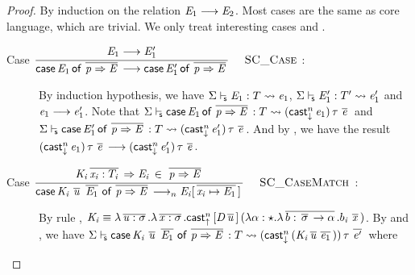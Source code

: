 \begin{proof}
    By induction on the relation $\mathit{E_{{\mathrm{1}}}}  \longrightarrow  \mathit{E_{{\mathrm{2}}}}$. Most cases are the same as
core language, which are trivial. We only treat interesting cases
 and .
    \begin{description}
        \item[Case \scriptsize{${\displaystyle\frac{\begin{array}{l} {\mathit{E_{{\mathrm{1}}}} \longrightarrow \mathit{E'_{{\mathrm{1}}}}} \end{array}}{ \mathsf{case} \, \mathit{E_{{\mathrm{1}}}} \, \mathsf{of} \, \,\overline{ \mathit{p} \Rightarrow \mathit{E} }\, \longrightarrow \mathsf{case} \, \mathit{E'_{{\mathrm{1}}}} \, \mathsf{of} \, \,\overline{ \mathit{p} \Rightarrow \mathit{E} }\,}\quad\textsc{ {\textsc{SC\_Case}}{} }}$}:] $\quad$ \\
        By induction hypothesis, we have $ \Sigma  \vdash_{\!\!\mathsf{s} }  \mathit{E_{{\mathrm{1}}}}  :  T   \rightsquigarrow   \mathit{e_{{\mathrm{1}}}} $, $ \Sigma  \vdash_{\!\!\mathsf{s} }  \mathit{E'_{{\mathrm{1}}}}  :  T'   \rightsquigarrow   \mathit{e'_{{\mathrm{1}}}} $ and $\mathit{e_{{\mathrm{1}}}}  \longrightarrow  \mathit{e'_{{\mathrm{1}}}}$. Note that $ \Sigma  \vdash_{\!\!\mathsf{s} }  \mathsf{case} \, \mathit{E_{{\mathrm{1}}}} \, \mathsf{of} \, \,\overline{  \mathit{p}  \Rightarrow  \mathit{E}  }\,  :  T   \rightsquigarrow   (  \mathsf{cast}_{\downarrow}^n \, \mathit{e_{{\mathrm{1}}}}  ) \, \tau \, \,\overline{  \mathit{e}  }\, $ and $ \Sigma  \vdash_{\!\!\mathsf{s} }  \mathsf{case} \, \mathit{E'_{{\mathrm{1}}}} \, \mathsf{of} \, \,\overline{  \mathit{p}  \Rightarrow  \mathit{E}  }\,  :  T   \rightsquigarrow   (  \mathsf{cast}_{\downarrow}^n \, \mathit{e'_{{\mathrm{1}}}}  ) \, \tau \, \,\overline{  \mathit{e}  }\, $. And by , we have the result
$(  \mathsf{cast}_{\downarrow}^n \, \mathit{e_{{\mathrm{1}}}}  ) \, \tau \, \,\overline{  \mathit{e}  }\,  \longrightarrow  (  \mathsf{cast}_{\downarrow}^n \, \mathit{e'_{{\mathrm{1}}}}  ) \, \tau \, \,\overline{  \mathit{e}  }\,$.
        \item[Case \scriptsize{${\displaystyle\frac{\begin{array}{l} {\mathit{K_{\mathit{i}}} \,\overline{ \mathit{x_{\mathit{i}}} : T_{\mathit{i}} }\, \Rightarrow \mathit{E_{\mathit{i}}} \, \in \, \,\overline{ \mathit{p} \Rightarrow \mathit{E} }\,} \end{array}}{ \mathsf{case} \, \mathit{K_{\mathit{i}}} \, \,\overline{ \mathit{u} }\, \, \,\overline{ \mathit{E_{{\mathrm{1}}}} }\, \, \mathsf{of} \, \,\overline{ \mathit{p} \Rightarrow \mathit{E} }\, \longrightarrow_n \mathit{E_{\mathit{i}}} [ \,\overline{ \mathit{x_{\mathit{i}}} \mapsto \mathit{E_{{\mathrm{1}}}} }\, ] \,}\quad\textsc{ {\textsc{SC\_CaseMatch}}{} }}$}:] $\quad$ \\
        By rule , $\mathit{K_{\mathit{i}}}  \equiv  \lambda  \,\overline{  \mathit{u}  :  \sigma  }\,  .  \lambda  \,\overline{  \mathit{x}  :  \sigma  }\,  .  \mathsf{cast}_{\uparrow}^n \, [  \mathit{D}    \,\overline{  \mathit{u}  }\,  ] \,  (  \lambda  \alpha  :  \star  .  \lambda  \,\overline{  b  :  \,\overline{  \sigma  }\,  \rightarrow  \alpha  }\,  .  b_{\mathit{i}} \, \,\overline{  \mathit{x}  }\,  )$. By
 and , we have $ \Sigma  \vdash_{\!\!\mathsf{s} }  \mathsf{case} \, \mathit{K_{\mathit{i}}} \, \,\overline{  \mathit{u}  }\, \, \,\overline{  \mathit{E_{{\mathrm{1}}}}  }\, \, \mathsf{of} \, \,\overline{  \mathit{p}  \Rightarrow  \mathit{E}  }\,  :  T   \rightsquigarrow   (  \mathsf{cast}_{\downarrow}^n \, (  \mathit{K_{\mathit{i}}}  \,\overline{  \mathit{u}  }\,  \,\overline{  \mathit{e_{{\mathrm{1}}}}  }\,  )  ) \, \tau \, \,\overline{  \mathit{e'}  }\, $ where

\end{description}
\end{proof}
